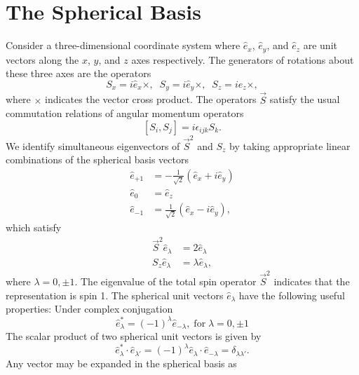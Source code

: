 \documentclass[12pt,letterpaper]{book}
\begin{document}
\section{The Spherical Basis}
Consider a three-dimensional coordinate system where $\hat{e}_x$, $\hat{e}_y$, and $\hat{e}_z$ are unit vectors along the $x$, $y$, and $z$ axes respectively. The generators of rotations about these three axes are the operators 
\begin{equation}
S_x=i\hat{e}_x\times,\;\;S_y=i\hat{e}_y\times,\;\;S_z=i\hat{e}_z\times,
\end{equation}
where $\times$ indicates the vector cross product. The operators $\vec{S}$ satisfy the usual commutation relations of angular momentum operators
\begin{equation}
\left[S_i,S_j\right]=i\epsilon_{ijk}S_k.
\end{equation}
We identify simultaneous eigenvectors of $\vec{S}^2$ and $S_z$ by taking appropriate linear combinations of the spherical basis vectors
\begin{equation}
\begin{split}
\hat{e}_{+1}&=-\frac{1}{\sqrt{2}}\left(\hat{e}_x+i\hat{e}_y\right)\\
\hat{e}_0&=\hat{e}_z\\
\hat{e}_{-1}&=\frac{1}{\sqrt{2}}\left(\hat{e}_x-i\hat{e}_y\right),
\end{split}
\end{equation}
which satisfy
\begin{equation}
\begin{split}
\vec{S}^2\hat{e}_\lambda&=2\hat{e}_\lambda\\
S_z\hat{e}_\lambda&=\lambda\hat{e}_\lambda,
\end{split}
\end{equation}
where $\lambda=0,\pm 1$. The eigenvalue of the total spin operator $\vec{S}^2$ indicates that the representation is spin 1. The spherical unit vectors $\hat{e}_\lambda$ have the following useful properties: Under complex conjugation
\begin{equation}
\hat{e}_\lambda^*=(-1)^\lambda\hat{e}_{-\lambda},\;\mathrm{for}\;\lambda=0,\pm 1
\end{equation}
The scalar product of two spherical unit vectors is given by 
\begin{equation}
\hat{e}_\lambda^*\cdot\hat{e}_{\lambda'}=(-1)^\lambda\hat{e}_\lambda\cdot\hat{e}_{-\lambda}=\delta_{\lambda\lambda'}.
\end{equation}
Any vector may be expanded in the spherical basis as
\end{document}
